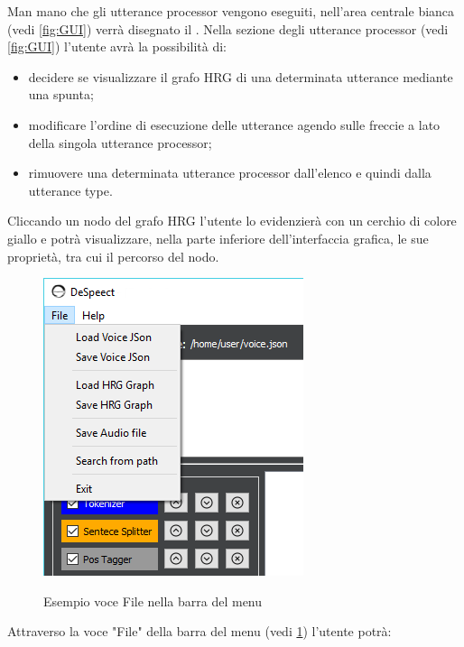 \documentclass[../AnalisideiRequisiti.tex]{subfiles}
\begin{document}
		 Man mano che gli utterance processor vengono eseguiti, nell'area centrale bianca (vedi \ref{fig:GUI}) verrà disegnato il .
		 Nella sezione degli utterance processor (vedi \ref{fig:GUI}) l'utente avrà la possibilità di:
		\begin{itemize}
			\item{}decidere se visualizzare il grafo HRG di una determinata utterance mediante una spunta;
			\item{}modificare l'ordine di esecuzione delle utterance agendo sulle freccie a lato della singola utterance processor;
			\item{}rimuovere una determinata utterance processor dall'elenco e quindi dalla utterance type.
		\end{itemize}
	
		 Cliccando un nodo del grafo HRG l'utente lo evidenzierà con un cerchio di colore giallo e potrà visualizzare, nella parte inferiore dell'interfaccia grafica, le sue proprietà, tra cui il percorso del nodo.
	\begin{figure}[htp]
	\caption{Esempio voce File nella barra del menu}
	\centering
	\includegraphics[]{../img/menu-file.png}
	\label{fig:menufile}
\end{figure}
	 Attraverso la voce "File" della barra del menu (vedi \ref{fig:menufile}) l'utente potrà:
	 	
\end{document}
